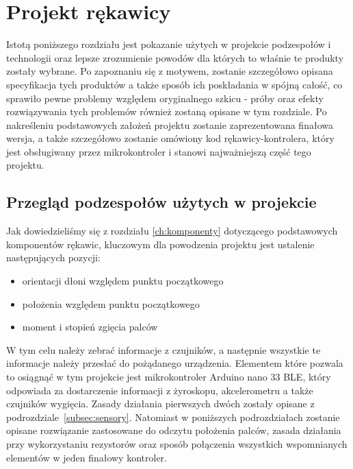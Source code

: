 \chapter{Projekt rękawicy}
\label{ch:projekt}
Istotą poniższego rozdziału jest pokazanie użytych w projekcie podzespołów i technologii oraz lepsze zrozumienie powodów dla których to właśnie te produkty zostały wybrane. Po zapoznaniu się z motywem, zostanie szczegółowo opisana specyfikacja tych produktów a także sposób ich poskładania w spójną całość, co sprawiło pewne problemy względem oryginalnego szkicu - próby oraz efekty rozwiązywania tych problemów również zostaną opisane w tym rozdziale. Po nakreśleniu podstawowych założeń projektu zostanie zaprezentowana finałowa wersja, a także szczegółowo zostanie omówiony kod rękawicy-kontrolera, który jest obsługiwany przez mikrokontroler i stanowi najważniejszą część tego projektu.


\section{Przegląd podzespołów użytych w projekcie}
\label{sec:przeglad}
Jak dowiedzieliśmy się z rozdziału \ref{ch:komponenty} dotyczącego podstawowych komponentów rękawic, kluczowym dla powodzenia projektu jest ustalenie następujących pozycji: 
\begin{itemize}
\item orientacji dłoni względem punktu początkowego
\item położenia względem punktu początkowego
\item moment i stopień zgięcia palców 
\end{itemize}
 W tym celu należy zebrać informacje z czujników, a następnie wszystkie te informacje należy przesłać do pożądanego urządzenia. Elementem które pozwala to osiągnąć w tym projekcie jest mikrokontroler Arduino nano 33 BLE, który odpowiada za dostarczenie informacji z żyroskopu, akcelerometru a także czujników wygięcia. Zasady działania pierwszych dwóch zostały opisane z podrozdziale~\ref{subsec:sensory}. Natomiast w poniższych podrozdziałach zostanie opisane rozwiązanie zastosowane do odczytu położenia palców, zasada działania przy wykorzystaniu rezystorów oraz sposób połączenia wszystkich wspomnianych elementów w jeden finałowy kontroler.
	
	
